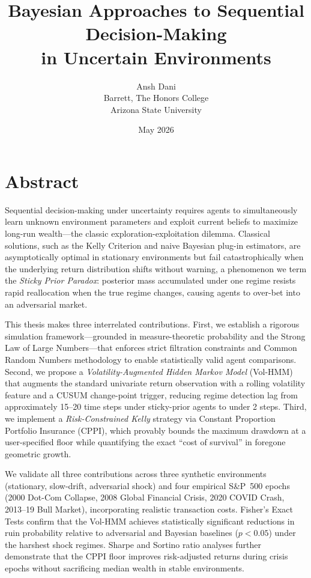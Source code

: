 \documentclass[12pt,oneside]{book}
\title{Bayesian Approaches to Sequential Decision-Making \\ in Uncertain Environments}
\author{Ansh Dani \\ Barrett, The Honors College \\ Arizona State University}
\date{May 2026}
\begin{document}
\maketitle

\chapter*{Abstract}

Sequential decision-making under uncertainty requires agents to simultaneously
learn unknown environment parameters and exploit current beliefs to maximize
long-run wealth—the classic exploration-exploitation dilemma. Classical
solutions, such as the Kelly Criterion and naive Bayesian plug-in estimators,
are asymptotically optimal in stationary environments but fail catastrophically
when the underlying return distribution shifts without warning, a phenomenon we
term the \emph{Sticky Prior Paradox}: posterior mass accumulated under one
regime resists rapid reallocation when the true regime changes, causing agents
to over-bet into an adversarial market.

This thesis makes three interrelated contributions.  First, we establish a
rigorous simulation framework—grounded in measure-theoretic probability and the
Strong Law of Large Numbers—that enforces strict filtration constraints and
Common Random Numbers methodology to enable statistically valid agent
comparisons.  Second, we propose a \emph{Volatility-Augmented Hidden Markov
Model} (Vol-HMM) that augments the standard univariate return observation with
a rolling volatility feature and a CUSUM change-point trigger, reducing regime
detection lag from approximately 15--20 time steps under sticky-prior agents to
under 2 steps.  Third, we implement a \emph{Risk-Constrained Kelly} strategy
via Constant Proportion Portfolio Insurance (CPPI), which provably bounds the
maximum drawdown at a user-specified floor while quantifying the exact ``cost
of survival'' in foregone geometric growth.

We validate all three contributions across three synthetic environments
(stationary, slow-drift, adversarial shock) and four empirical S\&P~500 epochs
(2000 Dot-Com Collapse, 2008 Global Financial Crisis, 2020 COVID Crash, 2013--19
Bull Market), incorporating realistic transaction costs.  Fisher's Exact Tests
confirm that the Vol-HMM achieves statistically significant reductions in ruin
probability relative to adversarial and Bayesian baselines
($p < 0.05$) under the harshest shock regimes.  Sharpe and Sortino ratio
analyses further demonstrate that the CPPI floor improves risk-adjusted returns
during crisis epochs without sacrificing median wealth in stable environments.
\end{document}
